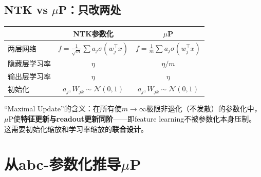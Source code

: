 \documentclass[11pt,a4paper]{article}
\newcommand{\cN}{\mathcal{N}}
\begin{document}
\subsection{NTK vs $\mu$P：只改两处}

\begin{center}
\renewcommand{\arraystretch}{1.3}
\begin{tabular}{l|cc}
\toprule
& NTK参数化 & $\mu$P \\
\midrule
两层网络 & $f=\frac{1}{\sqrt{m}}\sum a_j\sigma(w_j^\top x)$ & $f=\frac{1}{\boxed{m}}\sum a_j\sigma(w_j^\top x)$ \\
隐藏层学习率 & $\eta$ & $\eta/\boxed{m}$ \\
输出层学习率 & $\eta$ & $\eta$ \\
初始化 & $a_j,W_{jk}\sim\cN(0,1)$ & $a_j,W_{jk}\sim\cN(0,1)$ \\
\bottomrule
\end{tabular}
\end{center}

``Maximal Update''的含义：在所有使$m\to\infty$极限非退化（不发散）的参数化中，$\mu$P使\textbf{特征更新与readout更新同阶}——即feature learning不被参数化本身压制。这需要初始化缩放和学习率缩放的\textbf{联合设计}。

\section{从abc-参数化推导$\mu$P}
\end{document}
